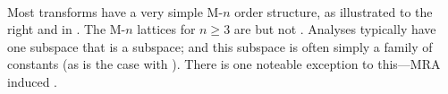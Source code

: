 \mbox{}\\
\begin{minipage}{\tw-65mm}%
  Most transforms have a very simple M-$n$ order structure,
  as illustrated to the right and in .
  The M-$n$ lattices for $n\ge3$ are  but not .
  Analyses typically have one subspace that is a  subspace;
  and this subspace is often simply a family of constants
  (as is the case with ).
  There is one noteable exception to this---MRA induced  .
\end{minipage}%
\hfill%
{\begin{minipage}{60mm}%
  \begin{center}
  \end{center}
\end{minipage}}



